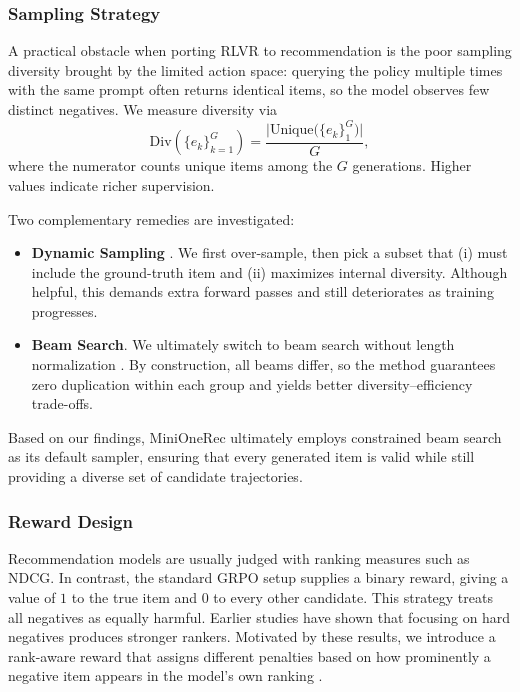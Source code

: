 \subsubsection{Sampling Strategy}
\label{subsection:sampling}

A practical obstacle when porting RLVR to recommendation is the poor sampling diversity brought by the limited action space: querying the policy multiple times with the same prompt often returns identical items, so the model observes few distinct negatives. We measure diversity via
\[
\mathrm{Div}\!\left(\{e_k\}_{k=1}^G\right)=
\frac{\bigl|\text{Unique}\bigl(\{e_k\}_{1}^{G}\bigr)\bigr|}{G},
\]
where the numerator counts unique items among the $G$ generations. Higher values indicate richer supervision.

Two complementary remedies are investigated:

\begin{itemize}
    \item \textbf{Dynamic Sampling} \citep{DAPO}. We first over-sample, then pick a subset that (i) must include the ground-truth item and (ii) maximizes internal diversity. Although helpful, this demands extra forward passes and still deteriorates as training progresses.

    \item \textbf{Beam Search}. We ultimately switch to beam search without length normalization \citep{D3, ReRe}. By construction, all beams differ, so the method guarantees zero duplication within each group and yields better diversity–efficiency trade-offs.
\end{itemize}

Based on our findings, MiniOneRec ultimately employs constrained beam search as its default sampler, ensuring that every generated item is valid while still providing a diverse set of candidate trajectories.

\subsubsection{Reward Design}
\label{method:reward}

Recommendation models are usually judged with ranking measures such as NDCG. In contrast, the standard GRPO setup supplies a binary reward, giving a value of $1$ to the true item and $0$ to every other candidate. This strategy treats all negatives as equally harmful. Earlier studies \citep{SGL,sdpo} have shown that focusing on hard negatives produces stronger rankers. Motivated by these results, we introduce a rank-aware reward that assigns different penalties based on how prominently a negative item appears in the model’s own ranking \citep{ReRe}.

